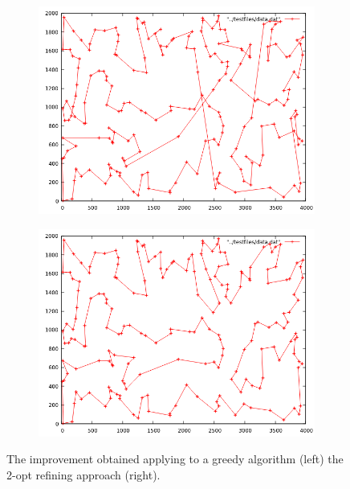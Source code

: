 \begin{figure}
	\centering
	
	\begin{subfigure}[b]{0.45\textwidth}
		\includegraphics[width=\textwidth]{images/kroA_greedy.png}
	\end{subfigure}
	\hfill
	\begin{subfigure}[b]{0.45\textwidth}
		\includegraphics[width=\textwidth]{images/2_opt.png}
	\end{subfigure}
	\caption{The improvement obtained applying to a greedy algorithm (left) the 2-opt refining approach (right).}
\end{figure}